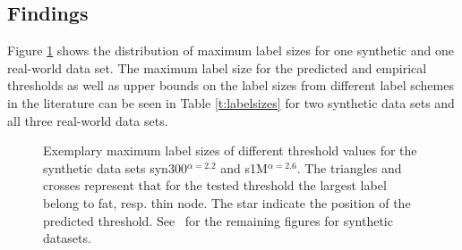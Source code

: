 \subsection{Findings}
Figure \ref{fig:findings} shows the distribution of maximum label sizes for one synthetic and one real-world data set. The maximum label size
for the predicted and empirical thresholds as well as upper bounds on the label sizes from different label schemes in the literature can be seen in Table \ref{t:labelsizes} for two synthetic
data sets and all three real-world data sets. 

\begin{figure}[!ht]
\centering
{}\hspace*{-2.5em}
%
\caption{Exemplary maximum label sizes of different threshold values for the synthetic data sets   syn300$^{\alpha=2.2}$ and s1M$^{\alpha=2.6}$. 
The triangles and crosses represent that for the tested threshold the largest label belong to fat, resp. thin node. The star indicate the position of the predicted threshold.
See~\cite{} for the remaining  figures for synthetic datasets.}
\label{fig:findings}%
\end{figure}




